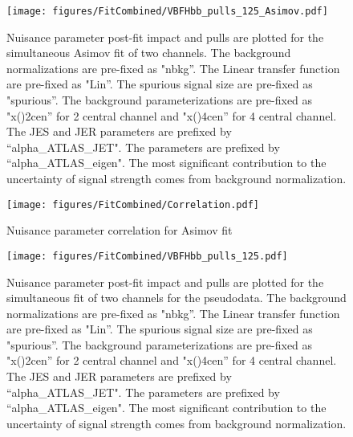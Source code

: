 \begin{figure}[htbp]
  \centering
 \texttt{[image: figures/FitCombined/VBFHbb\_pulls\_125\_Asimov.pdf]}

\caption{Nuisance parameter post-fit impact and pulls are plotted for the simultaneous Asimov fit of two channels. The background normalizations are pre-fixed as "nbkg''. The Linear transfer function are pre-fixed as "Lin''. The spurious signal size are pre-fixed as "spurious''. The background parameterizations are pre-fixed as  "x()2cen'' for 2 central channel and "x()4cen'' for 4 central channel. The JES and JER parameters are prefixed by ``alpha\_ATLAS\_JET".  The \btagging parameters are prefixed by ``alpha\_ATLAS\_eigen". The most significant contribution to the uncertainty of signal strength comes from background normalization.}
  \label{fig:pull_asimov-old}
\end{figure}


\begin{figure}[htbp]
  \centering
 \texttt{[image: figures/FitCombined/Correlation.pdf]}

\caption{Nuisance parameter correlation for Asimov fit}
  \label{fig:corr_asimov-old}
\end{figure}




\begin{figure}[htbp]
  \centering
 \texttt{[image: figures/FitCombined/VBFHbb\_pulls\_125.pdf]}

\caption{Nuisance parameter post-fit impact and pulls are plotted for the simultaneous fit of two channels for the pseudodata. The background normalizations are pre-fixed as "nbkg''. The Linear transfer function are pre-fixed as "Lin''. The spurious signal size are pre-fixed as "spurious''. The background parameterizations are pre-fixed as  "x()2cen'' for 2 central channel and "x()4cen'' for 4 central channel. The JES and JER parameters are prefixed by ``alpha\_ATLAS\_JET".  The \btagging parameters are prefixed by ``alpha\_ATLAS\_eigen". The most significant contribution to the uncertainty of signal strength comes from background normalization.}
  \label{fig:pull-old}
\end{figure}
